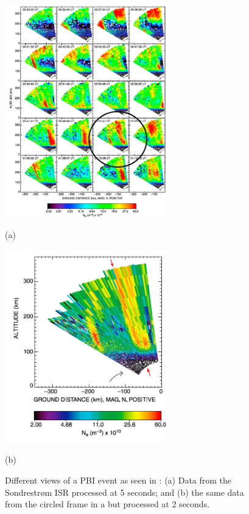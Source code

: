 \begin{figure}[htb]
  \begin{minipage}[t]{0.49\linewidth}\centering
    \includegraphics[width=7cm]{pbiall}
    \medskip
    \centerline{(a)}
  \end{minipage}\hfill
  \begin{minipage}[t]{0.49\linewidth}\centering
    \includegraphics[width=7cm]{pbifast}
    \medskip
    \centerline{(b)}
  \end{minipage}
  \caption{Different views of a PBI event as seen in \citet{Semeter:2005fo}: (a) Data from the Sondrestrøm ISR processed at 5 seconds; and (b) the same data from the circled frame in a but processed at 2 seconds.}
  \label{fig:Sampling}
\end{figure}

